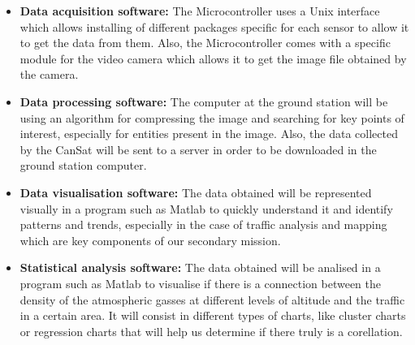 \documentclass[11pt]{article}
\begin{document}
\begin{itemize}
\item \textbf{Data acquisition software:} The Microcontroller uses a Unix interface which allows installing of different packages specific for each sensor to allow it to get the data from them. Also, the Microcontroller comes with a specific module for the video camera which allows it to get the image file obtained by the camera.
\item \textbf{Data  processing software:} The computer at the ground station will be using an algorithm for compressing the image and searching for key points of interest, especially for entities present in the image. Also, the data collected by the CanSat will be sent to a server in order to be downloaded in the ground station computer.
\item \textbf{Data visualisation software:} The data obtained will be represented visually in a program such as Matlab to quickly understand it and identify patterns and trends, especially in the case of traffic analysis and mapping which are key components of our secondary mission.
\item \textbf{Statistical analysis software:} The data obtained will be analised in a program such as Matlab to visualise if there is a connection between the density of the atmospheric gasses at different levels of altitude and the traffic in a certain area. It will consist in different types of charts, like cluster charts or regression charts that will help us determine if there truly is a corellation.
\end{itemize}
\end{document}
